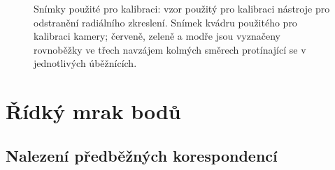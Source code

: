 \documentclass[11pt,oneside,a4paper,pdftex]{article}   %
\begin{document}
		\begin{figure}[htb]
			\centering
			\caption{Snímky použité pro kalibraci:  vzor použitý
				pro kalibraci nástroje pro odstranění radiálního zkreslení.
				 Snímek kvádru použitého pro
				kalibraci kamery; červeně, zeleně a modře jsou vyznačeny rovnoběžky ve třech
				navzájem kolmých směrech protínající se v jednotlivých úběžnících.}
		\end{figure}
	

\section{Řídký mrak bodů}
	
	\subsection{Nalezení předběžných korespondencí}
\end{document}
